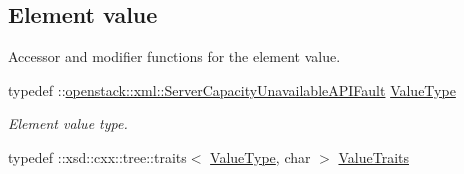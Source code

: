 \subsection*{Element value}
\label{_amgrp2ee2eae1a8c390ea033f241c027da8d6}
Accessor and modifier functions for the element value. \begin{DoxyCompactItemize}
\item 
\hypertarget{classopenstack_1_1xml_1_1ServerCapacityUnavailable_a4353528a31d60d84393d8279da6da244}{
typedef ::\hyperlink{classopenstack_1_1xml_1_1ServerCapacityUnavailableAPIFault}{openstack::xml::ServerCapacityUnavailableAPIFault} \hyperlink{classopenstack_1_1xml_1_1ServerCapacityUnavailable_a4353528a31d60d84393d8279da6da244}{ValueType}}
\label{classopenstack_1_1xml_1_1ServerCapacityUnavailable_a4353528a31d60d84393d8279da6da244}

\begin{DoxyCompactList}\small\item\em Element value type. \item\end{DoxyCompactList}\item 
\hypertarget{classopenstack_1_1xml_1_1ServerCapacityUnavailable_afdf800ffbf75eda7191d38aadbe70561}{
typedef ::xsd::cxx::tree::traits$<$ \hyperlink{classopenstack_1_1xml_1_1ServerCapacityUnavailableAPIFault}{ValueType}, char $>$ \hyperlink{classopenstack_1_1xml_1_1ServerCapacityUnavailable_afdf800ffbf75eda7191d38aadbe70561}{ValueTraits}}
\label{classopenstack_1_1xml_1_1ServerCapacityUnavailable_afdf800ffbf75eda7191d38aadbe70561}


\end{DoxyCompactItemize}
